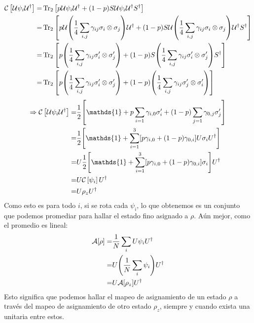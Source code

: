 \documentclass[onecolumn,11pt]{article}
\newcommand{\mcU}{\mathcal{U}}
\newcommand{\mcC}{\mathcal{C}}
\newcommand{\mcA}{\mathcal{A}}
\newcommand{\Id}{\mathds{1}}%
\newcommand{\CG}[1]{\mcC\left[#1\right]}
\begin{document}
\begin{align*}
\CG{\mcU \psi_{i} \mcU^{\dag}}=&\Tr_{2}\qty[p\mcU\psi_{i}\mcU^{\dag}+(1-p)S\mcU \psi_{i} \mcU^{\dag}S^{\dag}]\\
=&\Tr_{2}\qty[p\mcU\qty(\frac{1}{4}\sum_{i,j}\gamma_{ij} \sigma_i\otimes\sigma_j)\mcU^{\dag}+(1-p) S\mcU \qty(\frac{1}{4}\sum_{i,j}\gamma_{ij} \sigma_i\otimes\sigma_j) \mcU^{\dag} S^{\dag}]\\
=&\Tr_{2}\qty[p\qty(\frac{1}{4}\sum_{i,j}\gamma_{ij} \sigma_{i}'\otimes\sigma_{j}')+(1-p)S \qty(\frac{1}{4}\sum_{i,j}\gamma_{ij} \sigma_{i}'\otimes\sigma_{j}')S^{\dag}]\\
=&\Tr_{2}\qty[p\qty(\frac{1}{4}\sum_{i,j}\gamma_{ij} \sigma_{i}'\otimes\sigma_{j}')+(1-p)\qty(\frac{1}{4}\sum_{i,j}\gamma_{ij} \sigma_{j}'\otimes\sigma_{i}')]\\
\end{align*}
\begin{align*}
\Rightarrow\CG{\mcU \psi_{i} \mcU^{\dag}}=&\frac{1}{2}\qty[\Id +p\sum_{i=1}\gamma_{i,0}\sigma_{i}'+(1-p)\sum_{j=1}\gamma_{0,j}\sigma_{j}']\\
=&\frac{1}{2}\qty[\Id + \sum_{i=1}^3[p\gamma_{i,0}+(1-p)\gamma_{0,i}]U\sigma_{i}U^{\dag}]\\
=&U\frac{1}{2}\qty[\Id + \sum_{i=1}^3[p\gamma_{i,0}+(1-p)\gamma_{0,i}]\sigma_{i}]U^{\dag}\\
=&U\CG{\psi_{i}}U^{\dag}\\
=&U\rho_{z}U^{\dag}\\
\end{align*}
Como esto es para todo $i$, si se rota cada $\psi_{i}$, lo que obtenemos es un conjunto que podemos promediar para hallar el estado fino asignado a $\rho$. Aún mejor, como el promedio es lineal:
\begin{align}
\mcA[\rho]=&\frac{1}{N}\sum_{i}U\psi_{i}U^{\dag}\\
=&U\qty(\frac{1}{N}\sum_{i}\psi_{i})U^{\dag}\\
=&U\mcA[\rho_{z}]U^{\dag}
\end{align}
Esto significa que podemos hallar el mapeo de asignamiento de un estado $\rho$ a través del mapeo de asignamiento de otro estado $\rho_{z}$, siempre y cuando exista una unitaria entre estos.
\end{document}
